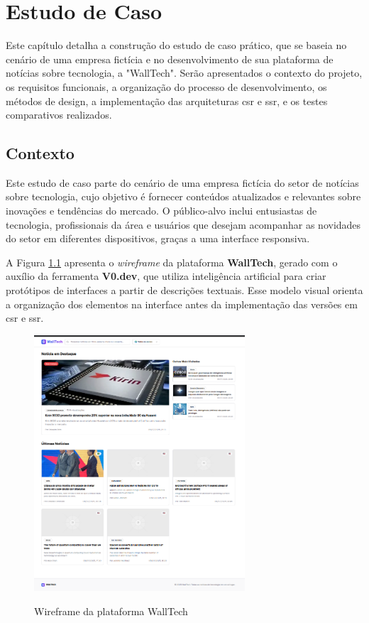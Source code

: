 \chapter{Estudo de Caso }
\label{cap:estudo_caso}
Este capítulo detalha a construção do estudo de caso prático, que se baseia no cenário de uma empresa fictícia e no desenvolvimento de sua plataforma de notícias sobre tecnologia, a "WallTech". Serão apresentados o contexto do projeto, os requisitos funcionais, a organização do processo de desenvolvimento, os métodos de design, a implementação das arquiteturas \acrshort{csr} e \acrshort{ssr}, e os testes comparativos realizados.

\section{Contexto}
\label{section:contexto}

Este estudo de caso parte do cenário de uma empresa fictícia do setor de notícias sobre tecnologia, cujo objetivo é fornecer conteúdos atualizados e relevantes sobre inovações e tendências do mercado. O público-alvo inclui entusiastas de tecnologia, profissionais da área e usuários que desejam acompanhar as novidades do setor em diferentes dispositivos, graças a uma interface responsiva.

A Figura \ref{fig:wireframe-walltech} apresenta o \textit{wireframe} da plataforma \textbf{WallTech}, gerado com o auxílio da ferramenta \textbf{V0.dev}, que utiliza inteligência artificial para criar protótipos de interfaces a partir de descrições textuais. Esse modelo visual orienta a organização dos elementos na interface antes da implementação das versões em \acrshort{csr} e \acrshort{ssr}.

\begin{figure}[H]
  \centering
  \caption{Wireframe da plataforma WallTech}
  \includegraphics[width=0.7\textwidth]{media/wall_tech_wireframe.png}
  \label{fig:wireframe-walltech}
\end{figure}

